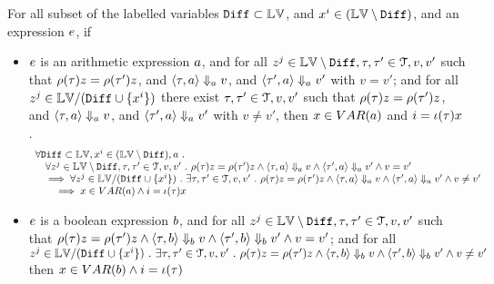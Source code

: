 \begin{lem}
	\label{lem:inv_expr_gnl}
	For all subset of the labelled variables $\mathtt{Diff} \subset \mathbb{LV}$, and $x^i \in (\mathbb{LV} \setminus \mathtt{Diff})$,
	and an expression $e$, if 
	\begin{itemize}
		\item $e$ is an arithmetic expression $a$,
		and for all $z^j \in \mathbb{LV} \setminus \mathtt{Diff}, \mathtt{\tau}, \mathtt{\tau}' \in \mathcal{T}, v, v'$ such that 
		$\rho(\mathtt{\tau}) z = \rho(\mathtt{\tau}') z$, and 
		$
		\langle \mathtt{\tau}, a \rangle \Downarrow_a v$, and $\langle \mathtt{\tau}', a \rangle \Downarrow_a v'$ with $v = v'$;
		and for all $z^j \in \mathbb{LV} / (\mathtt{Diff} \cup \{x^i\} )$ 
		there exist $\mathtt{\tau}, \mathtt{\tau}' \in \mathcal{T}, v, v'$ such that 
		$\rho(\mathtt{\tau}) z = \rho(\mathtt{\tau}') z$, and 
		$
		\langle \mathtt{\tau}, a \rangle \Downarrow_a v$, and $\langle \mathtt{\tau}', a \rangle \Downarrow_a v'$ with $v \neq v'$,
		then $x \in VAR(a)$ and $i = \iota(\mathtt{\tau}) x$.
		\[
			\begin{array}{l}
			\forall \mathtt{Diff} \subset \mathbb{LV},  x^i \in (\mathbb{LV} \setminus \mathtt{Diff}), a ~.~
			\\ \quad
			\forall z^j \in \mathbb{LV} \setminus \mathtt{Diff}, \mathtt{\tau}, \mathtt{\tau}' \in \mathcal{T}, v, v' ~.~ 
			\rho(\mathtt{\tau}) z = \rho(\mathtt{\tau}') z \land 
			\langle \mathtt{\tau}, a \rangle \Downarrow_a v \land \langle \mathtt{\tau}', a \rangle \Downarrow_a v' \land v = v'
			\\ \quad
			\implies 
			\forall z^j \in \mathbb{LV} / (\mathtt{Diff} \cup \{x^i\} ) ~.~ 
			\exists \mathtt{\tau}, \mathtt{\tau}' \in \mathcal{T}, v, v'~.~ 
			\rho(\mathtt{\tau}) z = \rho(\mathtt{\tau}') z \land 
			\langle \mathtt{\tau}, a \rangle \Downarrow_a v \land \langle \mathtt{\tau}', a \rangle \Downarrow_a v' \land v \neq v'
			\\ \qquad
			\implies x \in VAR(a) \land i = \iota(\mathtt{\tau}) x
			\end{array}
		\]
	\item $e$ is a boolean expression $b$,
	and for all $ z^j \in \mathbb{LV} \setminus \mathtt{Diff}, \mathtt{\tau}, \mathtt{\tau}' \in \mathcal{T}, v, v'$ such that 
	$ \rho(\mathtt{\tau}) z = \rho(\mathtt{\tau}') z \land 
	\langle \mathtt{\tau}, b \rangle \Downarrow_b v \land \langle \mathtt{\tau}', b \rangle \Downarrow_b v' \land v = v'$;
	and for all
	$ z^j \in \mathbb{LV} / (\mathtt{Diff} \cup \{x^i\} ) ~.~ 
	 \exists \mathtt{\tau}, \mathtt{\tau}' \in \mathcal{T}, v, v'~.~ 
	\rho(\mathtt{\tau}) z = \rho(\mathtt{\tau}') z \land 
	\langle \mathtt{\tau}, b \rangle \Downarrow_b v \land \langle \mathtt{\tau}', b \rangle \Downarrow_b v' \land v \neq v'$
	then 
	 $x \in VAR(b) \land i = \iota(\mathtt{\tau})$
	\[
		\begin{array}{l}

\end{array}\]
\end{itemize}
\end{lem}
